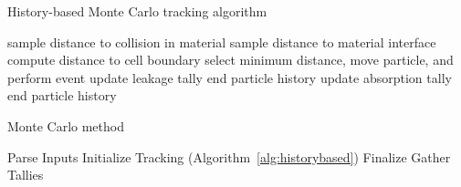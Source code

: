 \begin{algorithm}
\DontPrintSemicolon
\caption{History-based Monte Carlo tracking algorithm}
\label{alg:historybased}
{ 
    {
       sample distance to collision in material\;
       sample distance to material interface\;
       compute distance to cell boundary\;
       select minimum distance, move particle, and perform event\;
       {
          update leakage tally\;
          end particle history\;
       }
       {
          update absorption tally\;
          end particle history\;
       }
    }
}
\end{algorithm}

\begin{algorithm}
\DontPrintSemicolon
\caption{Monte Carlo method}
\label{alg:mcmethod}
Parse Inputs\;
{
	Initialize\;
	Tracking (Algorithm~\ref{alg:historybased})\;
	Finalize\;
}
Gather Tallies\;
\end{algorithm}




